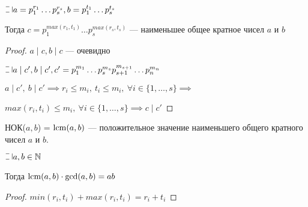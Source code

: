 \begin{theorem-non}
    $\letus a = p_1^{r_1} \ldots p_s^{r_s}, b = p_1^{t_1} \ldots p_s^{t_s}$

    Тогда $c = p_1^{max(r_1, t_1)} \ldots p_s^{max(r_s, t_s)}$ --- наименьшее общее кратное чисел $a$ и $b$
\end{theorem-non}

\begin{proof}
    $a \mid c, b \mid c$ --- очевидно

    $\letus a \mid c', b \mid c', c' = p_1^{m_1} \ldots p_s^{m_s} p_{s+1}^{m_{s+1}} \ldots p_n^{m_n}$

    $a \mid c',~b \mid c' \implies r_i \leq m_i,~t_i \leq m_i,~\forall i \in \{1, \ldots, s\} \implies$

    $max(r_i, t_i) \leq m_i,~\forall i \in \{1, \ldots, s\} \implies c \mid c'$
\end{proof}

\begin{defn}
    НОК($a, b$) = $\operatorname*{lcm}(a, b)$ --- положительное значение наименьшего общего кратного чисел $a$ и $b$. 
\end{defn}

\begin{follow}
    $\letus a, b \in \N$

    Тогда $\operatorname*{lcm}(a, b) \cdot \gcd(a, b) = ab$
\end{follow}

\begin{proof}
    $min(r_i, t_i) + max(r_i, t_i) = r_i + t_i$
\end{proof}